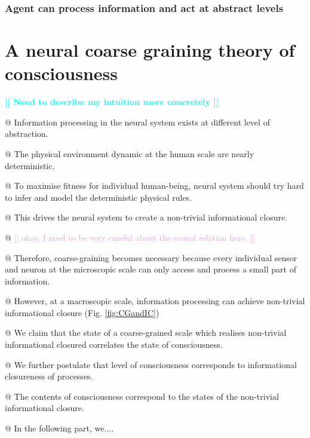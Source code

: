 \documentclass[utf8]{article}
\newenvironment{ants}
			{
			 \begin{easylist}[itemize]
			}
			{
			\end{easylist}
			}
\newcommand{\needref}[1]{%
			\ifthenelse{\equal{#1}{}}{%
				\todo[color=White, linecolor=BlueViolet]{\textcolor{BlueViolet}{Ref}}}{%
				\todo[color=White, linecolor=BlueViolet]{\textcolor{BlueViolet}{Ref: #1}}%
				}%
		}
\newcommand{\idea}[1]{\noindent
				\textcolor{Plum}{[[ #1 ]]}}
\newcommand{\toWrite}[1]{\noindent
			\textcolor{Cyan}{\textbf{[[ #1 ]]}}}
\begin{document}
			\subsubsection{Agent can process information and act at abstract levels}

			

	\section{A neural coarse graining theory of consciousness}
		\toWrite{Need to describe my intuition more concretely }
		
		\begin{ants}
			
				@ Information processing in the neural system exists at different level of abstraction.
				
				@ The physical environment dynamic at the human scale are nearly deterministic.\needref{Do we need ref here?} 
				
				@ To maximise fitness for individual human-being, neural system should try hard to infer and model the deterministic physical rules. 
				
				@ This drives the neural system to create a non-trivial informational closure.
				
				@ \idea{okay, I need to be very careful about the causal relation here.}
				
				@ Therefore, coarse-graining becomes necessary because every individual sensor and neuron at the microscopic scale can only access and process a small part of information.
				
				@ However, at a macroscopic scale, information processing can achieve non-trivial informational closure (Fig. \ref{fig:CGandIC})
			
			
				@ We claim that the state of a coarse-grained scale which realises non-trivial informational closured correlates the state of consciousness. 
				
				@ We further postulate that level of consciousness corresponds to informational closureness of processes. 
				
				@ The contents of consciousness correspond to the states of the non-trivial informational closure. 
				
				@ In the following part, we....
											
				
		\end{ants}
		
\end{document}
